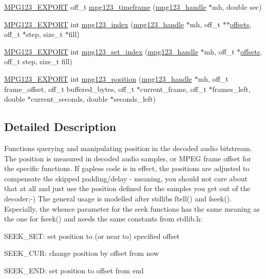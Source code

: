 \begin{DoxyCompactItemize}
\item 
\mbox{\hyperlink{mpg123_8h_a2ba98cfba3f760879df70e755b2a61cc}{M\+P\+G123\+\_\+\+E\+X\+P\+O\+RT}} off\+\_\+t \mbox{\hyperlink{group__mpg123__seek_gab6c3b85832ef3de29aafdb0ef790043b}{mpg123\+\_\+timeframe}} (\mbox{\hyperlink{group__mpg123__init_ga6728e2839a395f3a07d4514da659faca}{mpg123\+\_\+handle}} $\ast$mh, double sec)
\item 
\mbox{\hyperlink{mpg123_8h_a2ba98cfba3f760879df70e755b2a61cc}{M\+P\+G123\+\_\+\+E\+X\+P\+O\+RT}} int \mbox{\hyperlink{group__mpg123__seek_gae1d174ac632ec72df7dead94c04865fb}{mpg123\+\_\+index}} (\mbox{\hyperlink{group__mpg123__init_ga6728e2839a395f3a07d4514da659faca}{mpg123\+\_\+handle}} $\ast$mh, off\+\_\+t $\ast$$\ast$\mbox{\hyperlink{_s_d_l__opengl__glext_8h_a1b4d6c0d4a1eb8b693aa458f455ed705}{offsets}}, off\+\_\+t $\ast$step, size\+\_\+t $\ast$fill)
\item 
\mbox{\hyperlink{mpg123_8h_a2ba98cfba3f760879df70e755b2a61cc}{M\+P\+G123\+\_\+\+E\+X\+P\+O\+RT}} int \mbox{\hyperlink{group__mpg123__seek_ga0e59ca79cc1e1ad984ad46186e7f0665}{mpg123\+\_\+set\+\_\+index}} (\mbox{\hyperlink{group__mpg123__init_ga6728e2839a395f3a07d4514da659faca}{mpg123\+\_\+handle}} $\ast$mh, off\+\_\+t $\ast$\mbox{\hyperlink{_s_d_l__opengl__glext_8h_a1b4d6c0d4a1eb8b693aa458f455ed705}{offsets}}, off\+\_\+t step, size\+\_\+t fill)
\item 
\mbox{\hyperlink{mpg123_8h_a2ba98cfba3f760879df70e755b2a61cc}{M\+P\+G123\+\_\+\+E\+X\+P\+O\+RT}} int \mbox{\hyperlink{group__mpg123__seek_gafafcafb33dce9a28eb5ad07eb054149a}{mpg123\+\_\+position}} (\mbox{\hyperlink{group__mpg123__init_ga6728e2839a395f3a07d4514da659faca}{mpg123\+\_\+handle}} $\ast$mh, off\+\_\+t frame\+\_\+offset, off\+\_\+t buffered\+\_\+bytes, off\+\_\+t $\ast$current\+\_\+frame, off\+\_\+t $\ast$frames\+\_\+left, double $\ast$current\+\_\+seconds, double $\ast$seconds\+\_\+left)
\end{DoxyCompactItemize}


\subsection{Detailed Description}
Functions querying and manipulating position in the decoded audio bitstream. The position is measured in decoded audio samples, or M\+P\+EG frame offset for the specific functions. If gapless code is in effect, the positions are adjusted to compensate the skipped padding/delay -\/ meaning, you should not care about that at all and just use the position defined for the samples you get out of the decoder;-\/) The general usage is modelled after stdlib\textquotesingle{}s ftell() and fseek(). Especially, the whence parameter for the seek functions has the same meaning as the one for fseek() and needs the same constants from stdlib.\+h\+:
\begin{DoxyItemize}
\item S\+E\+E\+K\+\_\+\+S\+ET\+: set position to (or near to) specified offset
\item S\+E\+E\+K\+\_\+\+C\+UR\+: change position by offset from now
\item S\+E\+E\+K\+\_\+\+E\+ND\+: set position to offset from end
\end{DoxyItemize}


